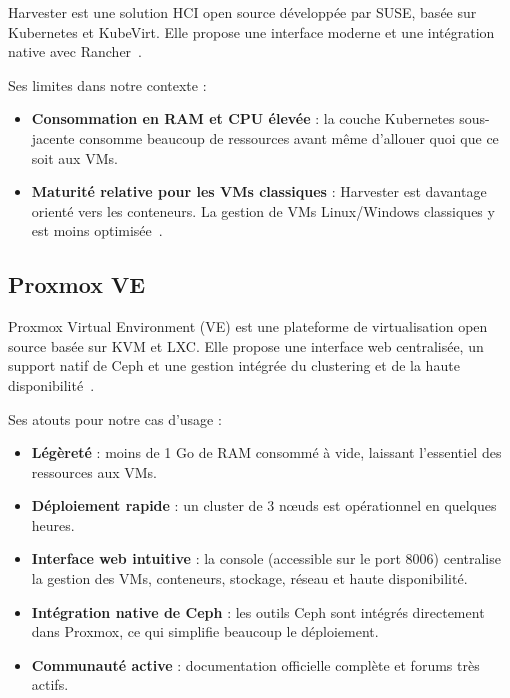 \par Harvester est une solution HCI open source développée par SUSE, basée sur Kubernetes et KubeVirt. Elle propose une interface moderne et une intégration native avec Rancher~\cite{ref5}.\\

\par Ses limites dans notre contexte :\\

\begin{itemize}

    \item \textbf{Consommation en RAM et CPU élevée} : la couche Kubernetes sous-jacente consomme beaucoup de ressources avant même d'allouer quoi que ce soit aux VMs.

    \item \textbf{Maturité relative pour les VMs classiques} : Harvester est davantage orienté vers les conteneurs. La gestion de VMs Linux/Windows classiques y est moins optimisée~\cite{ref4}.

\end{itemize}

\subsection{Proxmox VE}

\par Proxmox Virtual Environment (VE) est une plateforme de virtualisation open source basée sur KVM et LXC. Elle propose une interface web centralisée, un support natif de Ceph et une gestion intégrée du clustering et de la haute disponibilité~\cite{ref6}.\\

\par Ses atouts pour notre cas d'usage :\\

\begin{itemize}

    \item \textbf{Légèreté} : moins de 1 Go de RAM consommé à vide, laissant l'essentiel des ressources aux VMs.

    \item \textbf{Déploiement rapide} : un cluster de 3 n\oe{}uds est opérationnel en quelques heures.

    \item \textbf{Interface web intuitive} : la console (accessible sur le port 8006) centralise la gestion des VMs, conteneurs, stockage, réseau et haute disponibilité.

    \item \textbf{Intégration native de Ceph} : les outils Ceph sont intégrés directement dans Proxmox, ce qui simplifie beaucoup le déploiement.

    \item \textbf{Communauté active} : documentation officielle complète et forums très actifs.

\end{itemize}

